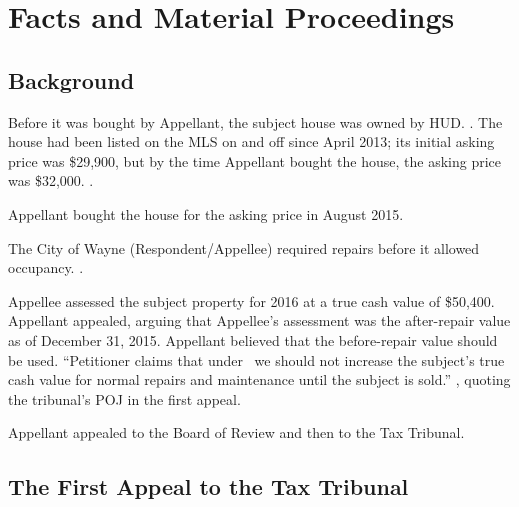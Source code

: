 \documentclass[12pt,\documentclassflag]{michiganCourtOfAppealsBrief}
\begin{document}

\section{Facts and Material Proceedings}
\label{facts}

\subsection{Background}

Before it was bought by Appellant, the subject house was owned by HUD.
\mlsListing[]. 
The house had been listed on the MLS on and off since April 2013;
its initial asking price was \$29,900,
but by the time Appellant bought the house, the asking price was \$32,000. \mlsHistory[].


Appellant bought the house for the asking price in August 2015. 

The City of Wayne (Respondent/Appellee) required repairs before it allowed occupancy. %
\repairs.

Appellee assessed the subject property for 2016 at a true cash value of \$50,400. Appellant appealed, arguing that Appellee's assessment was the after-repair value as of December 31, 2015.
Appellant believed that the before-repair value should be used. 
``Petitioner claims that under \mathieuGast\ we should not increase the subject's true cash value for normal repairs and maintenance until the subject is sold.'' , quoting the tribunal's POJ in the first appeal.

Appellant appealed to the Board of Review and then to the Tax Tribunal.

\subsection{The First Appeal to the Tax Tribunal}
\end{document}
